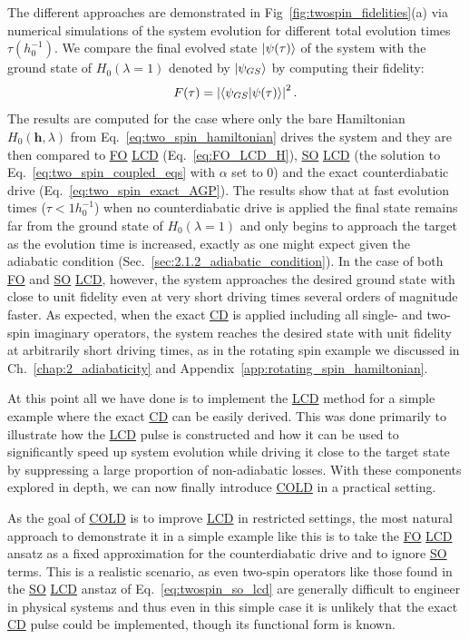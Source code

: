 \documentclass[a4paper,oneside,11pt]{book}
\newcommand{\hbb}{\boldsymbol{h}}
\newcommand{\acrref}[1]{\hyperref[acr:#1]{#1}}
\begin{document}
The different approaches are demonstrated in Fig~\ref{fig:twospin_fidelities}(a) via numerical simulations of the system evolution for different total evolution times $\tau (h_0^{-1})$. We compare the final evolved state $\ket{\psi(\tau)}$ of the system with the ground state of $H_0(\lambda = 1)$ denoted by $\ket{\psi_{GS}}$ by computing their fidelity:
\begin{equation}
    F(\tau) = \left|\braket{\psi_{GS}}{\psi(\tau)}\right|^2.
\end{equation}
The results are computed for the case where only the bare Hamiltonian $H_0(\hbb, \lambda)$ from Eq.~\ref{eq:two_spin_hamiltonian} drives the system and they are then compared to \acrref{FO} \acrref{LCD} (Eq.~\eqref{eq:FO_LCD_H}), \acrref{SO} \acrref{LCD} (the solution to Eq.~\eqref{eq:two_spin_coupled_eqs} with $\alpha$ set to $0$) and the exact counterdiabatic drive (Eq.~\eqref{eq:two_spin_exact_AGP}). The results show that at fast evolution times ($\tau < 1 h_0^{-1}$) when no counterdiabatic drive is applied the final state remains far from the ground state of $H_0(\lambda = 1)$ and only begins to approach the target as the evolution time is increased, exactly as one might expect given the adiabatic condition (Sec.~\ref{sec:2.1.2_adiabatic_condition}). In the case of both \acrref{FO} and \acrref{SO} \acrref{LCD}, however, the system approaches the desired ground state with close to unit fidelity even at very short driving times several orders of magnitude faster. As expected, when the exact \acrref{CD} is applied including all single- and two-spin imaginary operators, the system reaches the desired state with unit fidelity at arbitrarily short driving times, as in the rotating spin example we discussed in Ch.~\ref{chap:2_adiabaticity} and Appendix~\ref{app:rotating_spin_hamiltonian}.

At this point all we have done is to implement the \acrref{LCD} method for a simple example where the exact \acrref{CD} can be easily derived. This was done primarily to illustrate how the \acrref{LCD} pulse is constructed and how it can be used to significantly speed up system evolution while driving it close to the target state by suppressing a large proportion of non-adiabatic losses. With these components explored in depth, we can now finally introduce \acrref{COLD} in a practical setting.

As the goal of \acrref{COLD} is to improve \acrref{LCD} in restricted settings, the most natural approach to demonstrate it in a simple example like this is to take the \acrref{FO} \acrref{LCD} ansatz as a fixed approximation for the counterdiabatic drive and to ignore \acrref{SO} terms. This is a realistic scenario, as even two-spin operators like those found in the \acrref{SO} \acrref{LCD} anstaz of Eq.~\eqref{eq:twospin_so_lcd} are generally difficult to engineer in physical systems and thus even in this simple case it is unlikely that the exact \acrref{CD} pulse could be implemented, though its functional form is known.
\end{document}
